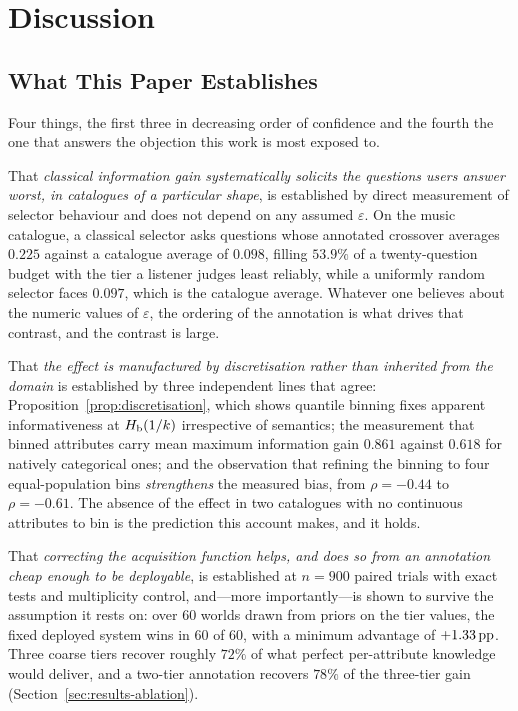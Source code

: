 \section{Discussion}
\label{sec:discussion}

\subsection{What This Paper Establishes}

Four things, the first three in decreasing order of confidence and the fourth
the one that answers the objection this work is most exposed to.

That \emph{classical information gain systematically solicits the questions
users answer worst, in catalogues of a particular shape}, is established by
direct measurement of selector behaviour and does not depend on any assumed
$\varepsilon$. On the music catalogue, a classical selector asks questions
whose annotated crossover averages $0.225$ against a catalogue average of
$0.098$, filling $53.9\%$ of a twenty-question budget with the tier a listener
judges least reliably, while a uniformly random selector faces $0.097$, which
is the catalogue average. Whatever one believes about the numeric values of
$\varepsilon$, the ordering of the annotation is what drives that contrast, and
the contrast is large.

That \emph{the effect is manufactured by discretisation rather than inherited
from the domain} is established by three independent lines that agree:
Proposition~\ref{prop:discretisation}, which shows quantile binning fixes
apparent informativeness at $H_{\mathrm{b}}(1/k)$ irrespective of semantics; the
measurement that binned attributes carry mean maximum information gain $0.861$
against $0.618$ for natively categorical ones; and the observation that
refining the binning to four equal-population bins \emph{strengthens} the
measured bias, from $\rho = -0.44$ to $\rho = -0.61$. The absence of the effect
in two catalogues with no continuous attributes to bin is the prediction this
account makes, and it holds.

That \emph{correcting the acquisition function helps, and does so from an
annotation cheap enough to be deployable}, is established at $n=900$ paired
trials with exact tests and multiplicity control, and---more importantly---is
shown to survive the assumption it rests on: over $60$ worlds drawn from priors
on the tier values, the fixed deployed system wins in $60$ of $60$, with a
minimum advantage of $+1.33\,\text{pp}$. Three coarse tiers recover roughly $72\%$ of
what perfect per-attribute knowledge would deliver, and a two-tier annotation
recovers $78\%$ of the three-tier gain (Section~\ref{sec:results-ablation}).

